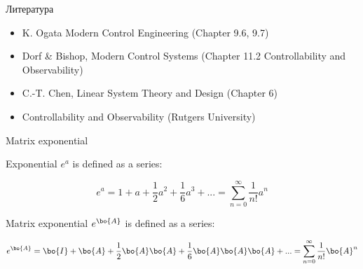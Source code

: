 \documentclass{beamer}
\begin{document}
\begin{frame}{Литература}
	
	\begin{itemize}
		
		
		\item K. Ogata Modern Control Engineering (Chapter 9.6, 9.7)
		
		\item Dorf \& Bishop, Modern Control Systems (Chapter 11.2 Controllability and Observability)		
		
		\item C.-T. Chen, Linear System Theory and Design (Chapter 6)
		
		\item Controllability and Observability (Rutgers University) 
		
	\end{itemize}
	
\end{frame}

\myqrframe


\begin{frame}
	
	
\end{frame}



\begin{frame}{Matrix exponential}
	\begin{flushleft}
		
		Exponential $e^a$ is defined as a series:
		
		\begin{equation}
			e^a =1+a+\frac{1}{2} a^2
			+\frac{1}{6} a^3 + ... = \sum_{n=0}^{\infty} \frac{1}{n!} a^n
		\end{equation}
		
		Matrix exponential $e^\bo{A}$ is defined as a series:
		
		\begin{equation}
			e^\bo{A} = \bo{I}+\bo{A}+\frac{1}{2} \bo{A}\bo{A}
			+\frac{1}{6} \bo{A}\bo{A}\bo{A} + ... = \sum_{n=0}^{\infty} \frac{1}{n!} \bo{A}^n
		\end{equation}
		
		
	\end{flushleft}
\end{frame}
\end{document}
